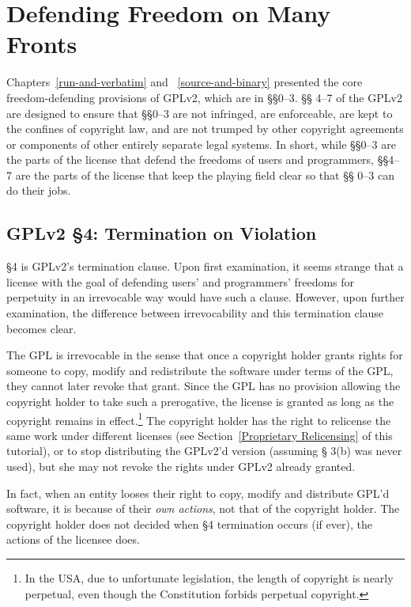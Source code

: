 \chapter{Defending Freedom on Many Fronts}

Chapters~\ref{run-and-verbatim} and ~\ref{source-and-binary} presented the
core freedom-defending provisions of GPLv2\@, which are in \S\S 0--3. \S\S
4--7 of the GPLv2 are designed to ensure that \S\S 0--3 are not infringed,
are enforceable, are kept to the confines of copyright law, and are not
trumped by other copyright agreements or components of other entirely
separate legal systems. In short, while \S\S 0--3 are the parts of the
license that defend the freedoms of users and programmers, \S\S 4--7 are
the parts of the license that keep the playing field clear so that \S\S
0--3 can do their jobs.

\section{GPLv2 \S 4: Termination on Violation}
\label{GPLs4}

\S 4 is GPLv2's termination clause. Upon first examination, it seems
strange that a license with the goal of defending users' and programmers'
freedoms for perpetuity in an irrevocable way would have such a clause.
However, upon further examination, the difference between irrevocability
and this termination clause becomes clear.

The GPL is irrevocable in the sense that once a copyright holder grants
rights for someone to copy, modify and redistribute the software under
terms of the GPL, they cannot later revoke that grant. Since the GPL has
no provision allowing the copyright holder to take such a prerogative, the
license is granted as long as the copyright remains in effect.\footnote{In
  the USA, due to unfortunate legislation, the length of copyright is
  nearly perpetual, even though the Constitution forbids perpetual
  copyright.} The copyright holder has the right to relicense the same
work under different licenses (see Section~\ref{Proprietary Relicensing}
of this tutorial), or to stop distributing the GPLv2'd version (assuming \S
3(b) was never used), but she may not revoke the rights under GPLv2
already granted.

In fact, when an entity looses their right to copy, modify and distribute
GPL'd software, it is because of their \emph{own actions}, not that of
the copyright holder. The copyright holder does not decided when \S 4
termination occurs (if ever), the actions of the licensee does.

